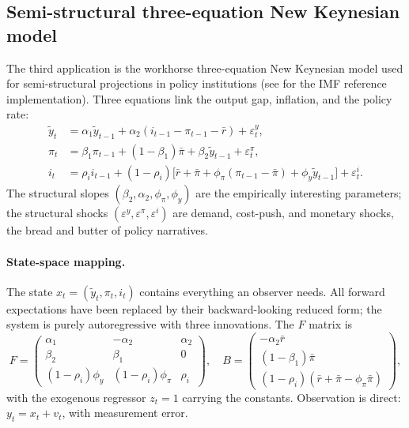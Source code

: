 \documentclass[11pt]{article}
\begin{document}
\subsection{Semi-structural three-equation New Keynesian model}
\label{sec:apps-nk}

The third application is the workhorse three-equation New Keynesian
model used for semi-structural projections in policy institutions
(see \citet{BergKaramLaxton2006} for the IMF reference
implementation).  Three equations link the output gap, inflation,
and the policy rate:
\begin{align}
\widetilde y_t &= \alpha_1\widetilde y_{t-1}+\alpha_2(i_{t-1}-\pi_{t-1}-\bar r)+\varepsilon^{y}_t,\\
\pi_t &= \beta_1\pi_{t-1}+(1-\beta_1)\bar\pi+\beta_2\widetilde y_{t-1}+\varepsilon^{\pi}_t,\\
i_t &= \rho_i i_{t-1}+(1-\rho_i)\bigl[\bar r+\bar\pi+\phi_\pi(\pi_{t-1}-\bar\pi)+\phi_y\widetilde y_{t-1}\bigr]+\varepsilon^{i}_t.
\end{align}
The structural slopes $(\beta_2,\alpha_2,\phi_\pi,\phi_y)$ are the
empirically interesting parameters; the structural shocks
$(\varepsilon^y,\varepsilon^\pi,\varepsilon^i)$ are demand,
cost-push, and monetary shocks, the bread and butter of policy
narratives.

\paragraph{State-space mapping.}  The state $x_t=(\widetilde y_t,\pi_t,i_t)$
contains everything an observer needs.  All forward
expectations have been replaced by their backward-looking reduced
form; the system is purely autoregressive with three innovations.
The $F$ matrix is
\begin{equation}
F=\begin{pmatrix}
\alpha_1 & -\alpha_2 & \alpha_2\\
\beta_2 & \beta_1 & 0\\
(1-\rho_i)\phi_y & (1-\rho_i)\phi_\pi & \rho_i
\end{pmatrix},
\quad
B=\begin{pmatrix}
-\alpha_2\bar r\\
(1-\beta_1)\bar\pi\\
(1-\rho_i)(\bar r+\bar\pi-\phi_\pi\bar\pi)
\end{pmatrix},
\end{equation}
with the exogenous regressor $z_t=1$ carrying the constants.
Observation is direct: $y_t=x_t+v_t$, with measurement error.
\end{document}

